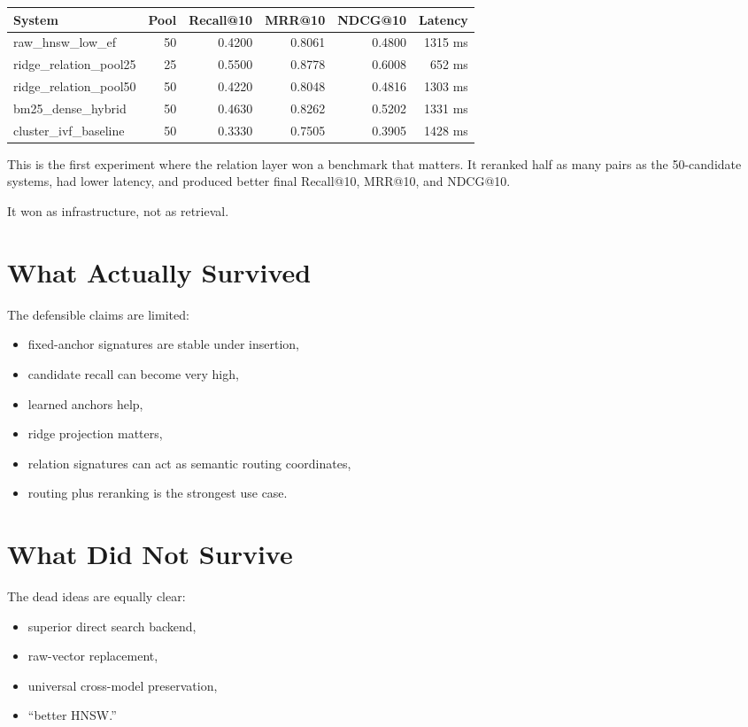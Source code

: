 \documentclass[10pt]{article}
\begin{document}
\begin{center}
\small
\begin{tabular}{lrrrrr}
\hline
System & Pool & Recall@10 & MRR@10 & NDCG@10 & Latency \\
\hline
raw\_hnsw\_low\_ef & 50 & 0.4200 & 0.8061 & 0.4800 & 1315 ms \\
ridge\_relation\_pool25 & 25 & 0.5500 & 0.8778 & 0.6008 & 652 ms \\
ridge\_relation\_pool50 & 50 & 0.4220 & 0.8048 & 0.4816 & 1303 ms \\
bm25\_dense\_hybrid & 50 & 0.4630 & 0.8262 & 0.5202 & 1331 ms \\
cluster\_ivf\_baseline & 50 & 0.3330 & 0.7505 & 0.3905 & 1428 ms \\
\hline
\end{tabular}
\end{center}

This is the first experiment where the relation layer won a benchmark that matters. It reranked half as many pairs as the 50-candidate systems, had lower latency, and produced better final Recall@10, MRR@10, and NDCG@10.

It won as infrastructure, not as retrieval.

\section*{What Actually Survived}

The defensible claims are limited:

\begin{itemize}
\item fixed-anchor signatures are stable under insertion,
\item candidate recall can become very high,
\item learned anchors help,
\item ridge projection matters,
\item relation signatures can act as semantic routing coordinates,
\item routing plus reranking is the strongest use case.
\end{itemize}

\section*{What Did Not Survive}

The dead ideas are equally clear:

\begin{itemize}
\item superior direct search backend,
\item raw-vector replacement,
\item universal cross-model preservation,
\item ``better HNSW.''
\end{itemize}
\end{document}
